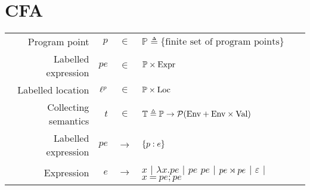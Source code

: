 \documentclass{article}
\begin{document}
\section{CFA}
\begin{center}
	\begin{tabular}{rrcl}
		Program point        & $p$                & $\in$         & $\mathbb{P}\triangleq\{\text{finite set of program points}\}$                                  \\
		Labelled expression  & $pe$               & $\in$         & $\mathbb{P}\times\text{Expr}$                                                                        \\
		Labelled location    & ${\ell}^{p}$ & $\in$         & $\mathbb{P}\times\text{Loc}$                                                                         \\
		Collecting semantics & $t$                & $\in$         & $\mathbb{T}\triangleq\mathbb{P}\rightarrow\mathcal{P}(\text{Env}+\text{Env}\times\text{Val})$                        \\
		Labelled expression  & $pe$               & $\rightarrow$ & $\{{p}:{e}\}$                                                                                \\
		Expression           & $e$                & $\rightarrow$ & $x$ | $\lambda x.pe$ | $pe$ $pe$ | ${pe}\rtimes{pe}$ | $\varepsilon$ | $x\:\texttt{=}\:pe;pe$
	\end{tabular}
\end{center}
\end{document}
